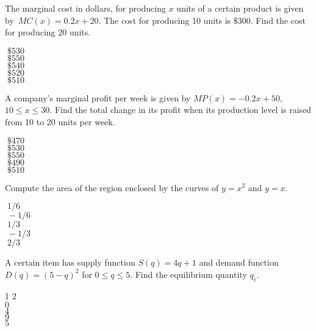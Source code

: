 \documentclass[12pt]{amsart}
\def\ds{\displaystyle}
\begin{document}
\makeanswersheet[]
\begin{exam}

\multiplechoiceStart[5 pts.]

\begin{problem}
The marginal cost in dollars,  for producing $x$
units of a certain product is given by $\,\ds MC(x)=0.2x+20$. The
cost for producing 10 units is $\$300$. Find the cost for
producing 20 units.
%
\begin{answers}{1}
$\;\$530$ \\
$\;\$550$ \\
$\;\$540$ \\
$\;\$520$ \\
$\;\$510$ \\
\end{answers}
\end{problem}


\begin{problem}
A company's marginal  profit per week is given by $MP(x)=-0.2x+50$, $10\le
x\le 30$. Find the total change in its profit when its production
level is raised from 10 to 20 units  per week.
\begin{answers}{1}
$\;\$470$ \\
$\;\$530$ \\
$\;\$550$ \\
$\;\$490$ \\
$\;\$510$ \\
\end{answers}

\end{problem}


\begin{problem}
Compute the area of the region enclosed by the
curves of $y=x^2$ and $y=x$.
%
\begin{answers}{1}
$\;1/6$ \\
$\;-1/6$\\
$\;1/3$ \\
$\;-1/3$\\
$\;2/3$ \\
\end{answers}

\end{problem}





\begin{problem}
A certain item has supply function
$S(q) = 4q+1$ and demand function
$D(q) = (5-q)^2$ for $0 \le q \le 5$.
Find the equilibrium quantity $q_e$.
%
\begin{answers}1
$2$ \\
$0$ \\
$4$ \\
$9$ \\
$5$ \\
\end{answers}
\end{problem}




\end{exam}
\end{document}
